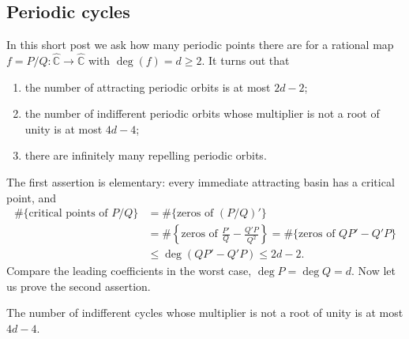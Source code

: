 \documentclass[11pt,a4paper]{article}
\begin{document}
\subsection{Periodic cycles}
In this short post we ask how many periodic points there are for a rational map $f=P/Q\colon\widehat{\mathbb C}\to\widehat{\mathbb C}$ with $\deg(f)=d\ge2$. It turns out that
\begin{enumerate}
\setcounter{enumi}{0}\item the number of attracting periodic orbits is at most $2d-2$;
\setcounter{enumi}{1}\item the number of indifferent periodic orbits whose multiplier is not a root of unity is at most $4d-4$;
\setcounter{enumi}{2}\item there are infinitely many repelling periodic orbits.
\end{enumerate}
The first assertion is elementary: every immediate attracting basin has a critical point, and
\begin{align*}
\#\{\text{critical points of }P/Q\}
&=\#\{\text{zeros of }(P/Q)'\}\\
&=\#\left\{\text{zeros of }\frac{P'}Q-\frac{Q'P}{Q^2}\right\}
=\#\{\text{zeros of }QP'-Q'P\}\\
&\le\deg(QP'-Q'P)\le2d-2.
\end{align*}
Compare the leading coefficients in the worst case, $\deg P=\deg Q=d$. Now let us prove the second assertion.
\setcounter{theorem}{19}\begin{proposition}\label{cd4:indifferent}
The number of indifferent cycles whose multiplier is not a root of unity is at most $4d-4$.
\end{proposition}
\end{document}

